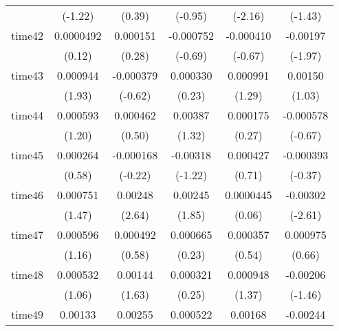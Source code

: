\begin{table}[htbp]
\begin{tabular}{l*{5}{c}}
            &     (-1.22)         &      (0.39)         &     (-0.95)         &     (-2.16)         &     (-1.43)         \\
time42      &   0.0000492         &    0.000151         &   -0.000752         &   -0.000410         &    -0.00197\sym{*}  \\
            &      (0.12)         &      (0.28)         &     (-0.69)         &     (-0.67)         &     (-1.97)         \\
time43      &    0.000944         &   -0.000379         &    0.000330         &    0.000991         &     0.00150         \\
            &      (1.93)         &     (-0.62)         &      (0.23)         &      (1.29)         &      (1.03)         \\
time44      &    0.000593         &    0.000462         &     0.00387         &    0.000175         &   -0.000578         \\
            &      (1.20)         &      (0.50)         &      (1.32)         &      (0.27)         &     (-0.67)         \\
time45      &    0.000264         &   -0.000168         &    -0.00318         &    0.000427         &   -0.000393         \\
            &      (0.58)         &     (-0.22)         &     (-1.22)         &      (0.71)         &     (-0.37)         \\
time46      &    0.000751         &     0.00248\sym{**} &     0.00245         &   0.0000445         &    -0.00302\sym{**} \\
            &      (1.47)         &      (2.64)         &      (1.85)         &      (0.06)         &     (-2.61)         \\
time47      &    0.000596         &    0.000492         &    0.000665         &    0.000357         &    0.000975         \\
            &      (1.16)         &      (0.58)         &      (0.23)         &      (0.54)         &      (0.66)         \\
time48      &    0.000532         &     0.00144         &    0.000321         &    0.000948         &    -0.00206         \\
            &      (1.06)         &      (1.63)         &      (0.25)         &      (1.37)         &     (-1.46)         \\
time49      &     0.00133\sym{*}  &     0.00255\sym{*}  &    0.000522         &     0.00168         &    -0.00244         \\

\end{tabular}
\end{table}
